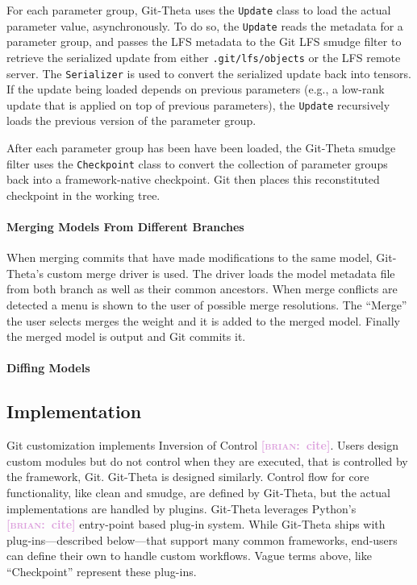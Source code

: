 \documentclass[nohyperref]{article}
\def\code#1{\texttt{#1}}
\theoremstyle{plain}
\theoremstyle{definition}
\theoremstyle{remark}
\newcommand{\brian}[1]{\textcolor{Plum}{\bf\small [\textsc{brian}:~#1]}}
\begin{document}
For each parameter group, Git-Theta uses the \code{Update} class to load the actual parameter value, asynchronously. To do so, the \code{Update} reads the metadata for a parameter group, and passes the LFS metadata to the Git LFS smudge filter to retrieve the serialized update from either  \code{.git/lfs/objects} or the LFS remote server.  The \code{Serializer} is used to convert the serialized update back into tensors. If the update being loaded depends on previous parameters (e.g., a low-rank update that is applied on top of previous parameters), the \code{Update} recursively loads the previous version of the parameter group.

After each parameter group has been  have been loaded, the Git-Theta smudge filter uses the \code{Checkpoint} class to convert the collection of parameter groups back into a framework-native checkpoint. Git then places this reconstituted checkpoint in the working tree.

\paragraph{Merging Models From Different Branches}
When merging commits that have made modifications to the same model, Git-Theta's custom merge driver is used. The driver loads the model metadata file from both branch as well as their common ancestors. When merge conflicts are detected a menu is shown to the user of possible merge resolutions. The ``Merge'' the user selects merges the weight and it is added to the merged model. Finally the merged model is output and Git commits it.

\paragraph{Diffing Models}

\subsection{Implementation} \label{sec:implementation}

Git customization implements Inversion of Control \brian{cite}. Users design custom modules but do not control when they are executed, that is controlled by the framework, Git. Git-Theta is designed similarly. Control flow for core functionality, like clean and smudge, are defined by Git-Theta, but the actual implementations are handled by plugins. Git-Theta leverages Python's \brian{cite} entry-point based plug-in system. While Git-Theta ships with plug-ins---described below---that support many common frameworks, end-users can define their own to handle custom workflows. Vague terms above, like ``Checkpoint'' represent these plug-ins.
\end{document}
